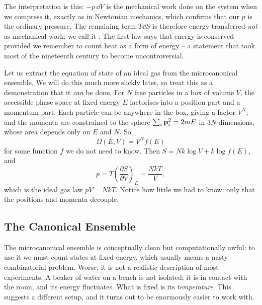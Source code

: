 \documentclass[a4paper]{scrartcl}
\begin{document}
The interpretation is this: $-p\,\dd V$ is the mechanical work done on the system when we compress it, exactly as in Newtonian mechanics, which confirms that our $p$ is the ordinary pressure. The remaining term $T \dd S$ is therefore energy transferred \emph{not} as mechanical work; we call it . The first law says that energy is conserved provided we remember to count heat as a form of energy -- a statement that took most of the nineteenth century to become uncontroversial.

\begin{example}\label{ex:idealmicro}
	Let us extract the equation of state of an ideal gas from the microcanonical ensemble. We will do this much more slickly later, so treat this as a demonstration that it \emph{can} be done. For $N$ free particles in a box of volume $V$, the accessible phase space at fixed energy $E$ factorises into a position part and a momentum part. Each particle can be anywhere in the box, giving a factor $V^N$; and the momenta are constrained to the sphere $\sum_i \mathbf{p}_i^2 = 2mE$ in $3N$ dimensions, whose area depends only on $E$ and $N$. So
	$$
	\Omega(E,V) = V^N f(E)
	$$
	for some function $f$ we do not need to know. Then $S = Nk \log V + k \log f(E)$, and
	$$
	p = T\left(\frac{\partial S}{\partial V}\right)_E = \frac{NkT}{V},
	$$
	which is the ideal gas law $pV = NkT$. Notice how little we had to know: only that the positions and momenta decouple.
\end{example}

\subsection{The Canonical Ensemble}\label{sec:canonical}

The microcanonical ensemble is conceptually clean but computationally awful: to use it we must count states at fixed energy, which usually means a nasty combinatorial problem. Worse, it is not a realistic description of most experiments. A beaker of water on a bench is not isolated; it is in contact with the room, and its energy fluctuates. What is fixed is its \emph{temperature}. This suggests a different setup, and it turns out to be enormously easier to work with.
\end{document}
